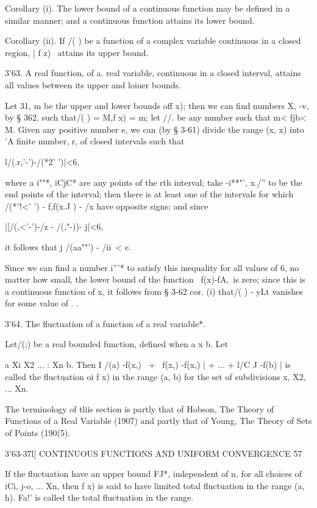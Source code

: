 Corollary (i). The lower bound of a continuous function may be defined
in a similar manner; and a continuous function attains its lower
bound.

Corollary (ii). If /( ) be a function of a complex variable continuous
in a closed region, | f z) \ attains its upper bound.

3'63. A real function, of a. real variable, continuous in a closed
interval, attains all values between its upper and loiuer bounds.

Let 31, m be the upper and lower bounds off x); then we can find
numbers X, -v, by § 362, such that/( ) = M,f x) = m; let //. be any
number such that m< fjb< M. Given any positive number e, we can (by §
3-61) divide the range (x, x) into 'A finite number, r, of closed
intervals such that

l/(.r,'-')-/(*2' ')|<6,

where a i""*, iCjC* are any points of the rth interval; take -i**"',
x./'' to be the end points of the interval; then there is at least
one of the intervals for which /(*'!<' ') - f,f(x.J ) - /x have
opposite signs; and since

|[/(,<'-')-/z - /(,"-))- j|<6,

it follows that j /(aa""') - /ii\ < e.

Since we can find a number i'''* to satisfy this inequality for all
values of 6, no matter how small, the lower bound of the function \
f(x)-fA,\ is zero; since this is a continuous function of x, it
follows from § 3-62 cor. (i) that/( ) - yLt vanishes for some value of
. .

3'64. The fluctuation of a function of a real variable*.

Let/(;) be a real bounded function, defined when a x b. Let

a Xi X2 ... : Xn b. Then I /(a) -f(x,) \ + \ f(x,) -f(x,) | + ... +
l/C J -f(b) | is called the fluctuation oi f x) in the range (a, b)
for the set of subdivisions x, X2, ... Xn.

The terminology of tliis section is partly that of Hobson, The Theory
of Functions of a Real Variable (1907) and partly that of Young, The
Theory of Sets of Points (190(5).



3'63-37l] CONTINUOUS FUNCTIONS AND UNIFORM CONVERGENCE 57

If the fluctuation have an upper bound FJ*, independent of n, for all
choices of iCi, j-o, ... Xn, then f x) is said to have limited total
fluctuation in the range (a, h). Fa!' is called the total fluctuation
in the range.

